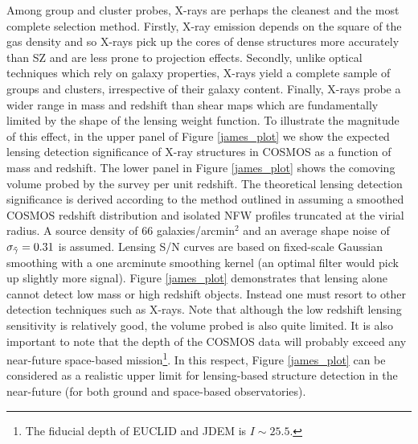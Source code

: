 \documentclass[12pt]{emulateapj}
\begin{document}
Among group and cluster probes, X-rays are perhaps the cleanest and
the most complete selection method. Firstly, X-ray emission depends on
the square of the gas density and so X-rays pick up the cores of dense
structures more accurately than SZ and are less prone to projection
effects. Secondly, unlike optical techniques which rely on galaxy
properties, X-rays yield a complete sample of groups and clusters,
irrespective of their galaxy content. Finally, X-rays probe a wider
range in mass and redshift than shear maps which are fundamentally
limited by the shape of the lensing weight function. To illustrate the
magnitude of this effect, in the upper panel of Figure
\ref{james_plot} we show the expected lensing detection significance
of X-ray structures in COSMOS as a function of mass and redshift. The
lower panel in Figure \ref{james_plot} shows the comoving volume
probed by the survey per unit redshift. The theoretical lensing
detection significance is derived according to the method outlined in
\citet{Hamana:2004} assuming a smoothed COSMOS redshift distribution
and isolated NFW profiles truncated at the virial radius. A source
density of 66 galaxies/arcmin$^2$ and an average shape noise of
$\sigma_{\rm \tilde\gamma}=0.31$ is assumed. Lensing S/N curves are
based on fixed-scale Gaussian smoothing with a one arcminute smoothing
kernel (an optimal filter would pick up slightly more signal). Figure
\ref{james_plot} demonstrates that lensing alone cannot detect low
mass or high redshift objects. Instead one must resort to other
detection techniques such as X-rays. Note that although the low
redshift lensing sensitivity is relatively good, the volume probed is
also quite limited. It is also important to note that the depth of the
COSMOS data will probably exceed any near-future space-based
mission\footnote[4]{The fiducial depth of EUCLID and JDEM is $I\sim
  25.5$.}. In this respect, Figure \ref{james_plot} can be considered
as a realistic upper limit for lensing-based structure detection in
the near-future (for both ground and space-based observatories).
\end{document}
